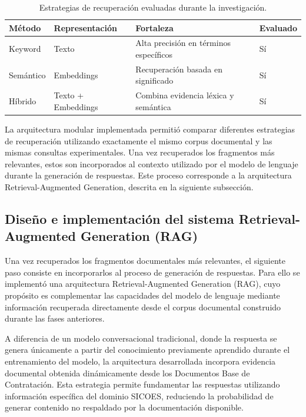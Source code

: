 \begin{table}[H]
\centering
\caption{Estrategias de recuperación evaluadas durante la investigación.}
\label{tab:retrieval_methods}

\begin{tabular}{p{3cm}p{3cm}p{5cm}p{3cm}}
\hline
\textbf{Método} &
\textbf{Representación} &
\textbf{Fortaleza} &
\textbf{Evaluado}\\
\hline

Keyword &
Texto &
Alta precisión en términos específicos &
Sí\\

Semántico &
Embeddings &
Recuperación basada en significado &
Sí\\

Híbrido &
Texto + Embeddings &
Combina evidencia léxica y semántica &
Sí\\

\hline
\end{tabular}

\end{table}

La arquitectura modular implementada permitió comparar diferentes estrategias de recuperación utilizando exactamente el mismo corpus documental y las mismas consultas experimentales. Una vez recuperados los fragmentos más relevantes, estos son incorporados al contexto utilizado por el modelo de lenguaje durante la generación de respuestas. Este proceso corresponde a la arquitectura Retrieval-Augmented Generation, descrita en la siguiente subsección.

\subsection{Diseño e implementación del sistema Retrieval-Augmented Generation (RAG)}

Una vez recuperados los fragmentos documentales más relevantes, el siguiente paso consiste en incorporarlos al proceso de generación de respuestas. Para ello se implementó una arquitectura Retrieval-Augmented Generation (RAG), cuyo propósito es complementar las capacidades del modelo de lenguaje mediante información recuperada directamente desde el corpus documental construido durante las fases anteriores.

A diferencia de un modelo conversacional tradicional, donde la respuesta se genera únicamente a partir del conocimiento previamente aprendido durante el entrenamiento del modelo, la arquitectura desarrollada incorpora evidencia documental obtenida dinámicamente desde los Documentos Base de Contratación. Esta estrategia permite fundamentar las respuestas utilizando información específica del dominio SICOES, reduciendo la probabilidad de generar contenido no respaldado por la documentación disponible.

